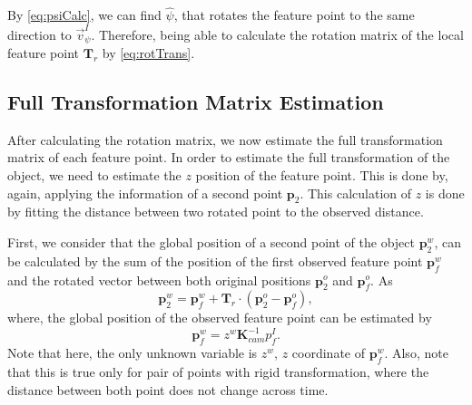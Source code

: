 \documentclass[annual]{acmsiggraph}
\begin{document}
By \eqref{eq:psiCalc}, we can find $\hat{\psi}$, that rotates the feature point to the same direction to $\vec{v}_{\psi}^I$. Therefore, being able to calculate the rotation matrix of the local feature point $\mathbf{T}_r$ by \eqref{eq:rotTrans}.



\subsection{Full Transformation Matrix Estimation}
\label{subsec:poseMethod:fullT}


After calculating the rotation matrix, we now estimate the full transformation matrix of each feature point. In order to estimate the full transformation of the object, we need to estimate the $z$ position of the feature point. This is done by, again, applying the information of a second point $\mathbf{p}_{2}$. This calculation of $z$ is done by fitting the distance between two rotated point to the observed distance. 



First, we consider that the global position of a second point of the object $\mathbf{p}_2^w$, can be calculated by the sum of the position of the first observed feature point $\mathbf{p}_f^w$ and the rotated vector between both original positions $\mathbf{p}^o_2$ and  $\mathbf{p}^o_f$. As
\begin{equation}
\mathbf{p}_2^w = \mathbf{p}_f^w + \mathbf{T}_{r}\cdot(\mathbf{p}^o_2 - \mathbf{p}^o_f),
\label{eq:p2w}
\end{equation}
where, the global position of the observed feature point can be estimated by 
\begin{equation}
\mathbf{p}_f^w = z^w\mathbf{K}^{-1}_{cam}p^I_f.
\label{eq:pfproj}
\end{equation}
Note that here, the only unknown variable is $z^w$, $z$ coordinate of $\mathbf{p}_{f}^w$. Also, note that this is true only for pair of points with rigid transformation, where the distance between both point does not change across time.   
\end{document}
